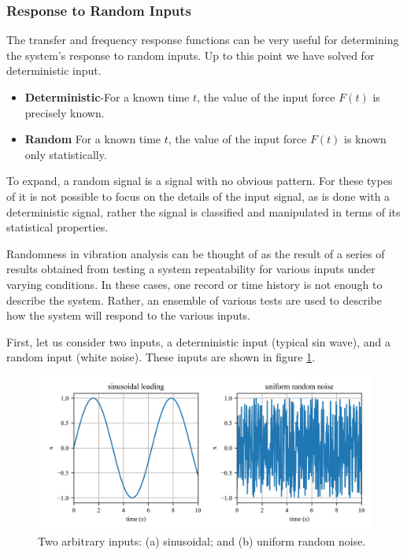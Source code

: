 \documentclass[12pt,letter]{article}
\numberwithin{ex}{section} %
\numberwithin{re}{section} %
\begin{document}
\subsubsection{Response to Random Inputs}
The transfer and frequency response functions can be very useful for determining the system's response to random inputs. Up to this point we have solved for deterministic input. 

\begin{itemize}
\item \textbf{Deterministic}-For a known time $t$, the value of the input force $F(t)$ is precisely known. 
\item \textbf{Random} For a known time $t$, the value of the input force $F(t)$ is known only statistically. 
\end{itemize}

To expand, a random signal is a signal with no obvious pattern. For these types of it is not possible to focus on the details of the input signal, as is done with a deterministic signal, rather the signal is classified and manipulated in terms of its statistical properties. 

Randomness in vibration analysis can be thought of as the result of a series of results obtained from testing a system repeatability for various inputs under varying conditions. In these cases, one record or time history is not enough to describe the system. Rather, an ensemble of various tests are used to describe how the system will respond to the various inputs. 

First, let us consider two inputs, a deterministic input (typical sin wave), and a random input (white noise). These inputs are shown in figure \ref{fig:Response_to_random_input_inputs}. 

\begin{figure}[H]
	\centering
	\includegraphics[width=1\textwidth]{../Figures/Response_to_random_input_inputs.png}
	\caption{Two arbitrary inputs: (a) sinusoidal; and (b) uniform random noise.}
	\label{fig:Response_to_random_input_inputs}
\end{figure}
\end{document}
